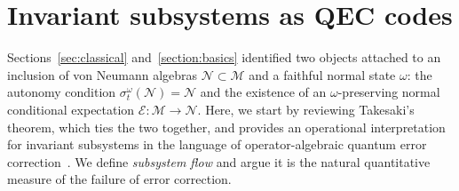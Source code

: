 \documentclass[a4paper,11pt]{article}
\theoremstyle{definition}
\newcommand{\mN}{\mathcal{N}}
\newcommand{\mM}{\mathcal{M}}
\newcommand{\mE}{\mathcal{E}}
\begin{document}
\section{Invariant subsystems as QEC codes}\label{sec:QEC}

Sections~\ref{sec:classical} and~\ref{section:basics} identified two objects attached to an inclusion of von Neumann algebras $\mN\subset \mM$ and a faithful normal state $\omega$: the autonomy condition $\sigma^{\omega}_t(\mathcal N)=\mathcal N$ and the existence of an $\omega$-preserving normal conditional expectation $\mE:\mathcal M\to\mathcal N$. Here, we start by reviewing Takesaki's theorem, which ties the two together, and provides an operational interpretation for invariant subsystems in the language of operator-algebraic quantum error correction~\cite{Faulkner2020,FaulknerSperanza2024}. We define {\it subsystem flow} and argue it is the natural quantitative measure of the failure of error correction. 
\end{document}
